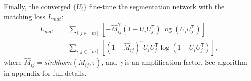 Finally, the converged $\{U_i\}$ fine-tune the segmentation network with the matching loss $L_{mat}$: 
\vspace{-5pt}
\begin{align}
    L_{mat} = & \sum_{i,j \in [m]} \left[ -\hat{M}_{ij}^\gamma (1 - U_i U_j^{\mathsf{T}}) \log(U_i U_j^{\mathsf{T}}) \right] \nonumber \\
     - & \sum_{i,j \in [m]} \left[ (1 - \hat{M}_{ij})^\gamma U_i U_j^{\mathsf{T}} \log(1 - U_i U_j^{\mathsf{T}}) \right],
\end{align}
where $\hat{M}_{ij} = sinkhorn(M_{ij}, \tau)$, and $\gamma$ is an amplification factor. See algorithm in appendix for full details.